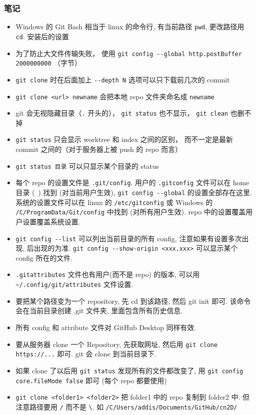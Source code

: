 \subsubsection{笔记}
\begin{itemize}
\item Windows 的 Git Bash 相当于 linux 的命令行, 有当前路径 \verb|pwd|, 更改路径用 \verb|cd|.
安装后的设置
\item 为了防止大文件传输失败， 使用 \verb|git config --global http.postBuffer 2000000000| （字节）
\item \verb|git clone| 时在后面加上 \verb|--depth N| 选项可以只下载前几次的 commit
\item \verb|git clone <url> newname| 会把本地 repo 文件夹命名成 \verb|newname|
\item git 会无视隐藏目录（\verb|.| 开头的）， \verb|git status| 也不显示， \verb|git clean| 也删不掉
\item \verb|git status| 只会显示 worktree 和 index 之间的区别， 而不一定是最新 commit 之间的（对于服务器上被 push 的 repo 而言）
\item \verb|git status 目录| 可以只显示某个目录的 status
\item 每个 repo 的设置文件是 \verb|.git/config|. 用户的 \verb|.gitconfig| 文件可以在 home 目录 (~) 找到 (对当前用户生效), \verb|git config --global| 的设置全部存在这里. 系统的设置文件可以在 linux 的 \verb|/etc/gitconfig| 或 Windows 的 \verb|/C/ProgramData/Git/config| 中找到 (对所有用户生效). repo 中的设置覆盖用户设置覆盖系统设置.
\item \verb|git config --list| 可以列出当前目录的所有 config, 注意如果有设置多次出现, 后出现的为准. \verb|git config --show-origin <xxx.xxx>| 可以显示某个 config 所在的文件.
\item \verb|.gitattributes| 文件也有用户(而不是 repo) 的版本, 可以用 \verb|~/.config/git/attributes| 文件设置.
\item 要把某个路径变为一个 repository, 先 cd 到该路径, 然后 git init 即可. 该命令会在当前目录创建 .git 文件夹, 里面包含所有历史信息.
\item 所有 config 和 attribute 文件对 GitHub Desktop 同样有效.
\item 要从服务器 clone 一个 Repository, 先获取网址, 然后用 \verb|git clone https://...| 即可. git 会 clone 到当前目录下.
\item 如果 clone 了以后用 \verb|git status| 发现所有的文件都改变了, 用 \verb|git config core.fileMode false| 即可 (每个 repo 都要使用)
\item \verb|git clone <folder1> <folder2>| 把 folder1 中的 repo 复制到 folder2 中. 但注意路径要用 \verb|/| 而不是 \verb|\|. 如 \verb|/C/Users/addis/Documents/GitHub/cn2D/|

\end{itemize}
